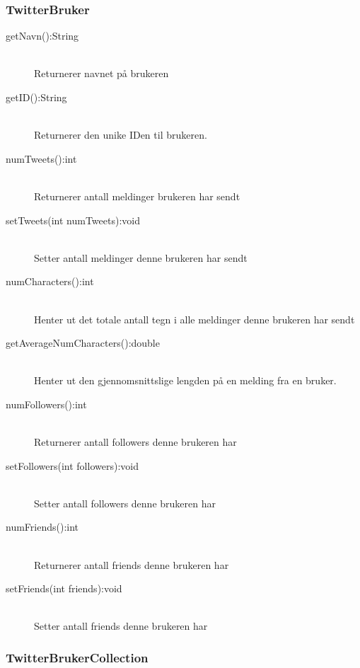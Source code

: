 \documentclass{article}
\begin{document}
\subsubsection{TwitterBruker}
\label{subsec:TwitterBruker}
\begin{description}
\item [getNavn():String] \ \\
  Returnerer navnet på brukeren
\item [getID():String] \ \\
  Returnerer den unike IDen til brukeren.
\item [numTweets():int] \ \\
  Returnerer antall meldinger brukeren har sendt
\item [setTweets(int numTweets):void] \ \\
  Setter antall meldinger denne brukeren har sendt
\item [numCharacters():int] \ \\
  Henter ut det totale antall tegn i alle meldinger denne brukeren har sendt
\item [getAverageNumCharacters():double] \ \\
  Henter ut den gjennomsnittslige lengden på en melding fra en bruker.
\item [numFollowers():int] \ \\
  Returnerer antall followers denne brukeren har
\item [setFollowers(int followers):void] \ \\
  Setter antall followers denne brukeren har
\item [numFriends():int] \ \\
  Returnerer antall friends denne brukeren har
\item [setFriends(int friends):void] \ \\
  Setter antall friends denne brukeren har
\end{description}
\newpage
\subsubsection{TwitterBrukerCollection}
\label{subsec:TwitterBrukerCollection}
\end{document}
